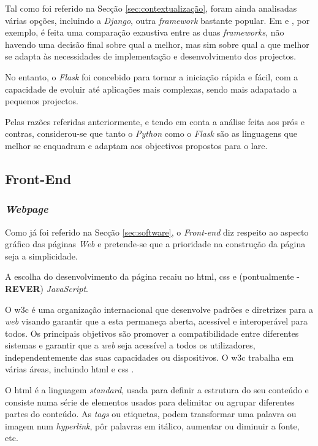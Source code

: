 Tal como foi referido na Secção \ref{sec:contextualização}, foram ainda analisadas várias opções, incluindo a \textit{Django}, outra \textit{framework} bastante popular. Em \cite{Djangovsflask} e \cite{FlaskvsDjango}, por exemplo, é feita uma comparação exaustiva entre as duas \textit{frameworks}, não havendo uma decisão final sobre qual a melhor, mas sim sobre qual a que melhor se adapta às necessidades de implementação e desenvolvimento dos projectos.

No entanto, o \textit{Flask} foi concebido para tornar a iniciação rápida e fácil, com a capacidade de evoluir até aplicações mais complexas, sendo mais adapatado a pequenos projectos.

Pelas razões referidas anteriormente, e tendo em conta a análise feita aos prós e contras, considerou-se que tanto o \textit{Python} como o \textit{Flask} são as linguagens que melhor se enquadram e adaptam aos objectivos propostos para o \acrshort{lare}.

\subsection{Front-End}
\subsubsection{\textit{Webpage}}
Como já foi referido na Secção \ref{sec:software}, o \textit{Front-end} diz respeito ao aspecto gráfico das páginas \textit{Web} e pretende-se que a prioridade na construção da página seja a simplicidade.

A escolha do desenvolvimento da página recaiu no \acrshort{html}, \acrshort{css} e (pontualmente - \textbf{REVER}) \textit{JavaScript}.

O \acrfull{w3c} é uma organização internacional que desenvolve padrões e diretrizes para a \textit{web} visando garantir que a esta permaneça aberta, acessível e interoperável para todos. Os principais objetivos são promover a compatibilidade entre diferentes sistemas e garantir que a \textit{web} seja acessível a todos os utilizadores, independentemente das suas capacidades ou dispositivos. O \acrshort{w3c} trabalha em várias áreas, incluindo \acrshort{html} e \acrshort{css} \cite{W3C}.

O \acrshort{html} é a linguagem \textit{standard}, usada para definir a estrutura do seu conteúdo e consiste numa série de elementos usados para delimitar ou agrupar diferentes partes do conteúdo. As \textit{tags} ou etiquetas, podem transformar uma palavra ou imagem num \textit{hyperlink}, pôr palavras em itálico, aumentar ou diminuir a fonte, etc. \cite{HTMLbasics}

